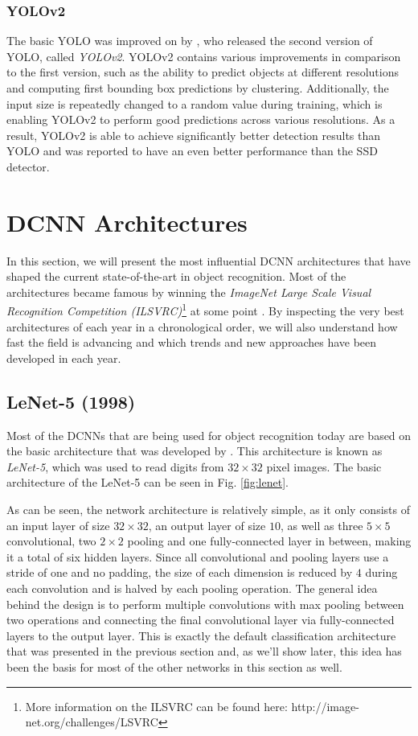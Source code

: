 \documentclass[conference]{IEEEtran}
\begin{document}
\subsubsection{YOLOv2}
The basic YOLO was improved on by \cite{YOLO9000}, who released the second version of YOLO, called \emph{YOLOv2}. YOLOv2 contains various improvements in comparison to the first version, such as the ability to predict objects at different resolutions and computing first bounding box predictions by clustering. Additionally, the input size is repeatedly changed to a random value during training, which is enabling YOLOv2 to perform good predictions across various resolutions. As a result, YOLOv2 is able to achieve significantly better detection results than YOLO and was reported \cite{YOLO9000} to have an even better performance than the SSD detector.



\section{DCNN Architectures}\label{sec:architectures}
In this section, we will present the most influential DCNN architectures that have shaped the current state-of-the-art in object recognition. Most of the architectures became famous by winning the \emph{ImageNet Large Scale Visual Recognition Competition (ILSVRC)}\footnote{More information on the ILSVRC can be found here: http://image-net.org/challenges/LSVRC} at some point \cite{ILSVRC}. By inspecting the very best architectures of each year in a chronological order, we will also understand how fast the field is advancing and which trends and new approaches have been developed in each year.


\subsection{LeNet-5 (1998)}\label{subsec:lenet}
Most of the DCNNs that are being used for object recognition today are based on the basic architecture that was developed by \cite{LeNet5}. This architecture is known as \emph{LeNet-5}, which was used to read digits from $32\times32$ pixel images. The basic architecture of the LeNet-5 can be seen in Fig. \ref{fig:lenet}.

As can be seen, the network architecture is relatively simple, as it only consists of an input layer of size $32\times32$, an output layer of size $10$, as well as three $5\times5$ convolutional, two $2\times2$ pooling and one fully-connected layer in between, making it a total of six hidden layers. Since all convolutional and pooling layers use a stride of one and no padding, the size of each dimension is reduced by $4$ during each convolution and is halved by each pooling operation. The general idea behind the design is to perform multiple convolutions with max pooling between two operations and connecting the final convolutional layer via fully-connected layers to the output layer. This is exactly the default classification architecture that was presented in the previous section and, as we'll show later, this idea has been the basis for most of the other networks in this section as well.
\end{document}
